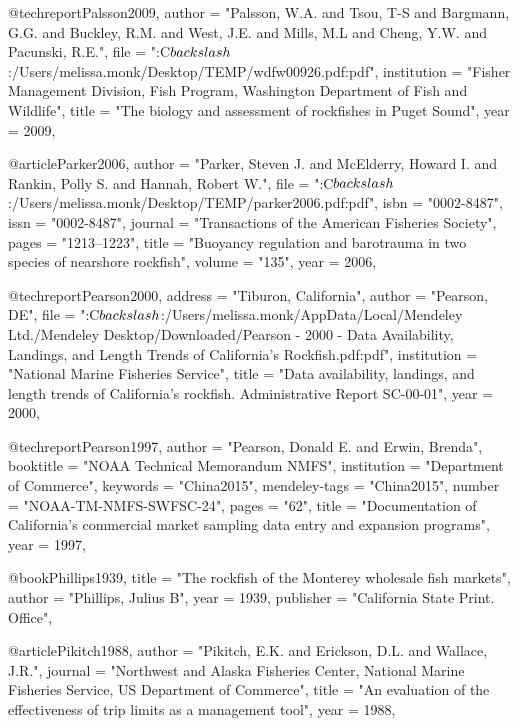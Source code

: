 @techreport{Palsson2009,
    author = "{Palsson, W.A. and Tsou, T-S and Bargmann, G.G. and Buckley, R.M. and West, J.E. and Mills, M.L and Cheng, Y.W. and Pacunski, R.E.}",
    file = "{:C$\\backslash$:/Users/melissa.monk/Desktop/TEMP/wdfw00926.pdf:pdf}",
    institution = "{Fisher Management Division, Fish Program, Washington Department of Fish and Wildlife}",
    title = "{{The biology and assessment of rockfishes in Puget Sound}}",
    year = 2009,
}

@article{Parker2006,
    author = "{Parker, Steven J. and McElderry, Howard I. and Rankin, Polly S. and Hannah, Robert W.}",
    file = "{:C$\\backslash$:/Users/melissa.monk/Desktop/TEMP/parker2006.pdf:pdf}",
    isbn = "{0002-8487}",
    issn = "{0002-8487}",
    journal = "{Transactions of the American Fisheries Society}",
    pages = "{1213--1223}",
    title = "{{Buoyancy regulation and barotrauma in two species of nearshore rockfish}}",
    volume = "{135}",
    year = 2006,
}

@techreport{Pearson2000,
    address = "{Tiburon, California}",
    author = "{Pearson, DE}",
    file = "{:C$\\backslash$:/Users/melissa.monk/AppData/Local/Mendeley Ltd./Mendeley Desktop/Downloaded/Pearson - 2000 - Data Availability, Landings, and Length Trends of California's Rockfish.pdf:pdf}",
    institution = "{National Marine Fisheries Service}",
    title = "{{Data availability, landings, and length trends of California's rockfish. Administrative Report SC-00-01}}",
    year = 2000,
}

@techreport{Pearson1997,
    author = "{Pearson, Donald E. and Erwin, Brenda}",
    booktitle = "{NOAA Technical Memorandum NMFS}",
    institution = "{Department of Commerce}",
    keywords = "{China2015}",
    mendeley-tags = "{China2015}",
    number = "{NOAA-TM-NMFS-SWFSC-24}",
    pages = "{62}",
    title = "{{Documentation of California's commercial market sampling data entry and expansion programs}}",
    year = 1997,
}

@book{Phillips1939,
    title = "{The rockfish of the Monterey wholesale fish markets}",
    author = "{Phillips, Julius B}",
    year = 1939,
    publisher = "{California State Print. Office}",
}

@article{Pikitch1988,
    author = "{Pikitch, E.K. and Erickson, D.L. and Wallace, J.R.}",
    journal = "{Northwest and Alaska Fisheries Center, National Marine Fisheries Service, US Department of Commerce}",
    title = "{{An evaluation of the effectiveness of trip limits as a management tool}}",
    year = 1988,
}

